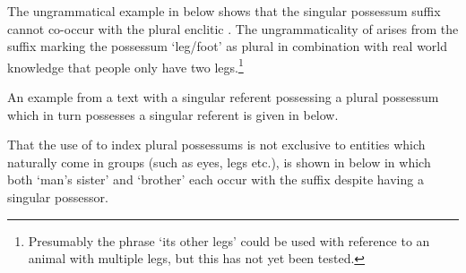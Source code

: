 The ungrammatical example in  below
shows that the singular possessum suffix  cannot
co-occur with the plural enclitic .
The ungrammaticality of 
arises from the suffix  marking the possessum 
`leg/foot' as plural in combination with real world knowledge
that people only have two legs.\footnote{
		Presumably the phrase  `its other legs'
		could be used with reference to an animal with multiple legs,
		but this has not yet been tested.}

\begin{exe}
	\label{ex:*hin maatn iin}
	\label{ex:*hiin haer bian=ee}
\end{exe}

An example from a text with a singular referent
possessing a plural possessum which in turn
possesses a singular referent is given in  below.

\begin{exe}
	\label{ex:RO-170822-3, 2.12}
\end{exe}

That the use of  to index plural possessums
is not exclusive to entities which naturally come in
groups (such as eyes, legs etc.), is shown in  below
in which both  `man's sister' and  `brother'
each occur with the suffix  despite having a singular possessor.

\begin{exe}
	\label{ex:RO-170917-1, 8.06-8.11}
\end{exe}

